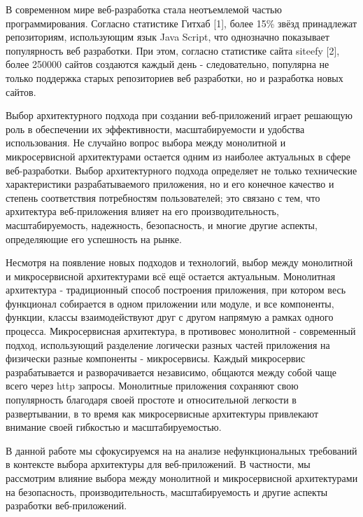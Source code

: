    В современном мире веб-разработка стала неотъемлемой частью программирования. Согласно статистике Гитхаб [1], более 15\% звёзд принадлежат репозиториям, использующим язык Java Script, что однозначно показывает популярность веб разработки. При этом, согласно статистике сайта siteefy [2], более 250000 сайтов создаются каждый день - следовательно, популярна не только поддержка старых репозиториев веб разработки, но и разработка новых сайтов.
    
    Выбор архитектурного подхода при создании веб-приложений играет решающую роль в обеспечении их эффективности, масштабируемости и удобства использования. Не случайно вопрос выбора между монолитной и микросервисной архитектурами остается одним из наиболее актуальных в сфере веб-разработки. Выбор архитектурного подхода определяет не только технические характеристики разрабатываемого приложения, но и его конечное качество и степень соответствия потребностям пользователей; это связано с тем, что архитектура веб-приложения влияет на его производительность, масштабируемость, надежность, безопасность, и многие другие аспекты, определяющие его успешность на рынке.
    
    Несмотря на появление новых подходов и технологий, выбор между монолитной и микросервисной архитектурами всё ещё остается актуальным. Монолитная архитектура - традиционный способ построения приложения, при котором весь функционал собирается в одном приложении или модуле, и все компоненты, функции, классы взаимодействуют друг с другом напрямую а рамках одного процесса. Микросервисная архитектура, в противовес монолитной - современный подход, использующий разделение логически разных частей приложения на физически разные компоненты - микросервисы. Каждый микросервис разрабатывается и разворачивается независимо, общаются между собой чаще всего через http запросы. Монолитные приложения сохраняют свою популярность благодаря своей простоте и относительной легкости в развертывании, в то время как микросервисные архитектуры привлекают внимание своей гибкостью и масштабируемостью.
    
    В данной работе мы сфокусируемся на  на анализе нефункциональных требований в контексте выбора архитектуры для веб-приложений. В частности, мы рассмотрим влияние выбора между монолитной и микросервисной архитектурами на безопасность, производительность, масштабируемость и другие аспекты разработки веб-приложений.

\clearpage